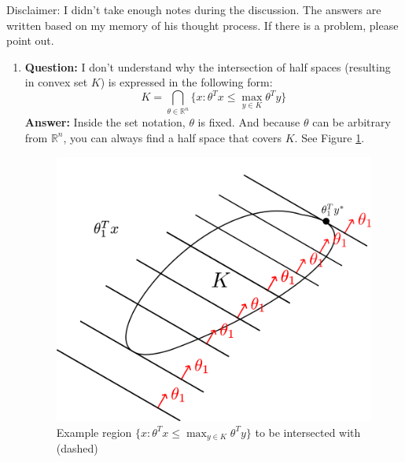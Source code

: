 \documentclass[12pt]{article}
\title{}
\begin{document}
\pagestyle{fancy}
\fancyhf{} %
\cfoot{\thepage}
\renewcommand{\headrulewidth}{1pt}

Disclaimer: I didn't take enough notes during the discussion. The answers are written based on my memory of his thought process. If there is a problem, please point out.

\begin{enumerate}
\item \textbf{Question:} I don't understand why the intersection of half spaces (resulting in convex set $K$) is expressed in the following form:
  \begin{equation}
    K = \bigcap_{\theta\in\mathbb{R}^n}\{x: \theta^Tx \leq \max_{y\in K} \theta^Ty\}
  \end{equation}
  \textbf{Answer:} Inside the set notation, $\theta$ is fixed. And because $\theta$ can be arbitrary from $\mathbb{R}^n$, you can always find a half space that covers $K$. See Figure \ref{fig:halfspace}.
  \begin{figure}[h]
    \centering
    \includegraphics[scale=1]{figs/halfspace}
    \caption{Example region $\{x: \theta^Tx\leq\max_{y\in K}\theta^Ty\}$ to be intersected with (dashed)}
    \label{fig:halfspace}
  \end{figure}


\end{enumerate}
\end{document}
